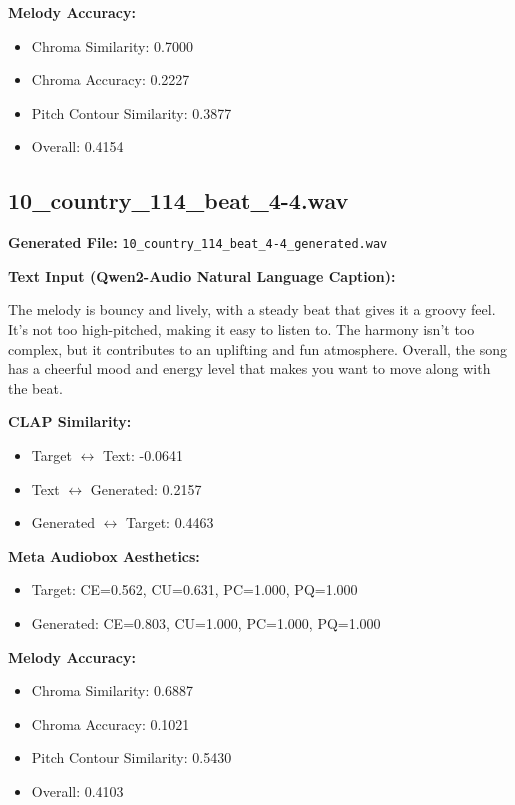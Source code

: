 \documentclass{article}
\begin{document}
\begin{CJK}{UTF8}{bsmi}
\textbf{Melody Accuracy:}
\begin{itemize}
    \item Chroma Similarity: 0.7000
    \item Chroma Accuracy: 0.2227
    \item Pitch Contour Similarity: 0.3877
    \item Overall: 0.4154
\end{itemize}

\subsection{10\_country\_114\_beat\_4-4.wav}

\textbf{Generated File:} \texttt{10\_country\_114\_beat\_4-4\_generated.wav}

\textbf{Text Input (Qwen2-Audio Natural Language Caption):}

\small
The melody is bouncy and lively, with a steady beat that gives it a groovy feel. It's not too high-pitched, making it easy to listen to. The harmony isn't too complex, but it contributes to an uplifting and fun atmosphere. Overall, the song has a cheerful mood and energy level that makes you want to move along with the beat.
\normalsize

\textbf{CLAP Similarity:}
\begin{itemize}
    \item Target $\leftrightarrow$ Text: -0.0641
    \item Text $\leftrightarrow$ Generated: 0.2157
    \item Generated $\leftrightarrow$ Target: 0.4463
\end{itemize}

\textbf{Meta Audiobox Aesthetics:}
\begin{itemize}
    \item Target: CE=0.562, CU=0.631, PC=1.000, PQ=1.000
    \item Generated: CE=0.803, CU=1.000, PC=1.000, PQ=1.000
\end{itemize}

\textbf{Melody Accuracy:}
\begin{itemize}
    \item Chroma Similarity: 0.6887
    \item Chroma Accuracy: 0.1021
    \item Pitch Contour Similarity: 0.5430
    \item Overall: 0.4103
\end{itemize}


\end{CJK}
\end{document}
